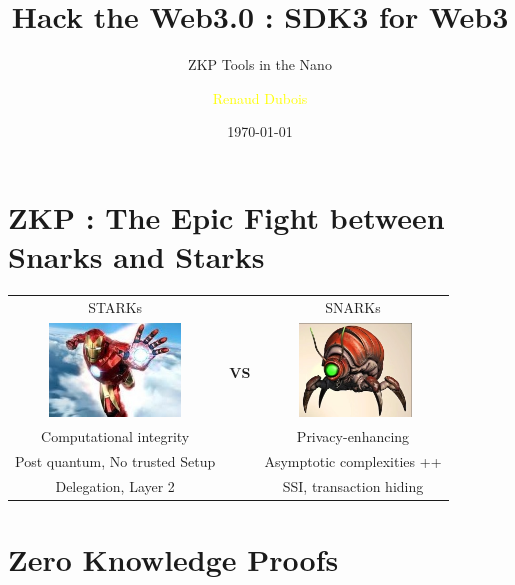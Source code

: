 \documentclass[aspectratio=43]{beamer}
\title{Hack the Web3.0 : SDK3 for Web3} %
\subtitle{ZKP Tools in the Nano}
\author[R. Dubois]{\textcolor{yellow}{Renaud Dubois}}
\institute[LIT]{
    \textcolor{white}{Ledger}%
    \\%
    \textcolor{white}{Innovation Team}%
} %
\date{\today}
\begin{document}
    
    \frame{\titlepage}
    
\section{ZKP : The Epic Fight between Snarks and Starks}
 

\begin{frame}
 \begin{center}
    
 \begin{tabular}{|ccc|} 
\hline
 STARKs & & SNARKs\\
 
 \includegraphics[width=3.5cm]{images/stark.jpg}
  &
  \huge{\bf VS}
  &~~~
 \includegraphics[width=3cm]{images/snark.jpg}~~~\\
 \hline
 Computational integrity  & & Privacy-enhancing\\
 \hline
 Post quantum, No trusted Setup && Asymptotic complexities ++ \\
 \hline
 Delegation, Layer 2 && SSI, transaction hiding \\
 \hline
 \end{tabular}
 \end{center}
 
 
\end{frame}

\section{Zero Knowledge Proofs}
\end{document}
